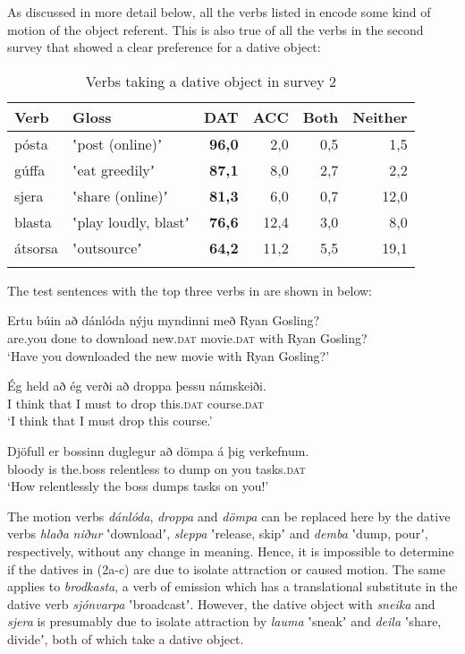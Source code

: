 \documentclass[output=paper,modfonts,nonflat,colorlinks,citecolor=brown]{langsci/langscibook}
\begin{document}
{As discussed in more detail below, all the verbs listed in  encode some kind of motion of the object referent. This is also true of all the verbs in the second survey that showed a clear preference for a dative object:

\begin{table}
{\caption{\label{tab:jonsson:2}Verbs taking a dative object in survey 2}}
\begin{tabularx}{\textwidth}{XXrrrr}
\lsptoprule
Verb & Gloss & \textbf{DAT} & ACC & Both & Neither\\
\midrule
pósta & ʽpost (online)ʼ & \textbf{96,0} & 2,0 & 0,5 & 1,5\\
gúffa & ʽeat greedilyʼ & \textbf{87,1} & 8,0 & 2,7 & 2,2\\
sjera & ʽshare (online)ʼ & \textbf{81,3} & 6,0 & 0,7 & 12,0\\
blasta & ʽplay loudly, blastʼ & \textbf{76,6} & 12,4 & 3,0 & 8,0\\
átsorsa & ʽoutsourceʼ & \textbf{64,2} & 11,2 & 5,5 & 19,1\\
\lspbottomrule
\end{tabularx}
\end{table}

The test sentences with the top three verbs in  are shown in  below:


\ea%
    \label{ex:jonsson:2}

\ea
\gll  Ertu  búin  að  dánlóda  nýju  myndinni  með  Ryan  Gosling?\\
   are.you  done  to  download  new.\textsc{dat}  movie.\textsc{dat}  with  Ryan  Gosling?\\
\glt `Have you downloaded the new movie with Ryan Gosling?'
 

\ex
\gll   Ég  held  að  ég  verði  að  droppa  þessu  námskeiði.\\
 I  think  that  I  must  to  drop  this.\textsc{dat}  course.\textsc{dat}\\
\glt `I think that I must drop this course.'
 

\ex
\gll   Djöfull  er  bossinn  duglegur  að  dömpa  á  þig  verkefnum.\\
 bloody  is  the.boss  relentless  to  dump  on  you  tasks.\textsc{dat}\\
\glt `How relentlessly the boss dumps tasks on you!'
\z
\z

The motion verbs \textit{dánlóda}, \textit{droppa} and \textit{dömpa} can be replaced here by the dative verbs \textit{hlaða} \textit{niður} ʽdownloadʼ, \textit{sleppa} ʽrelease, skipʼ and \textit{demba} ʽdump, pourʼ, respectively, without any change in meaning.\textstyleFootnoteSymbol{} Hence, it is impossible to determine if the datives in (2a-c) are due to isolate attraction or caused motion. The same applies to \textit{brodkasta}, a verb of emission which has a translational substitute in the dative verb \textit{sjónvarpa} ʽbroadcastʼ. However, the dative object with \textit{sneika} and \textit{sjera} is presumably due to isolate attraction by \textit{lauma} ʽsneakʼ and \textit{deila} ʽshare, divideʼ, both of which take a dative object.

}
\end{document}
